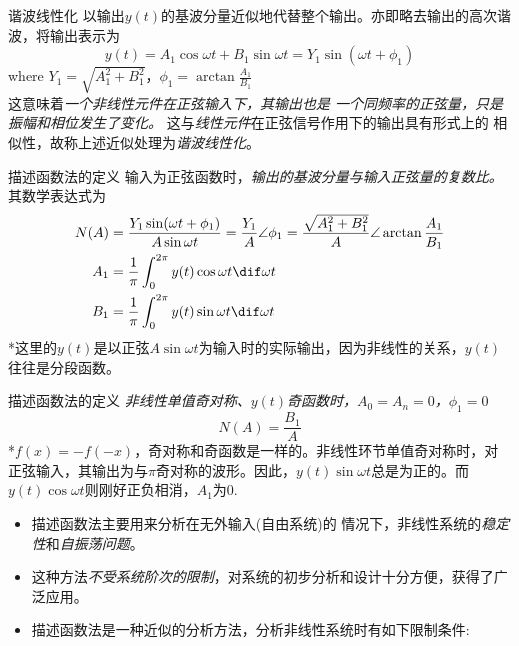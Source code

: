 \documentclass[handout,cjkutf8,table,aspectratio=1610]{beamer} %
\begin{document}
\begin{frame}{谐波线性化}
	以输出$y(t)$的基波分量近似地代替整个输出。亦即略去输出的高次谐波，将输出表示为
	$$y(t)=A_1\cos\omega t+B_1\sin\omega t=Y_1\sin(\omega t+\phi_1)$$
	where $Y_1=\sqrt{A_1^2+B_1^2}$，$\phi_1=\arctan\frac{A_1}{B_1}$\\
	这意味着\emph{一个非线性元件在正弦输入下，其输出也是 一个同频率的正弦量，只是振幅和相位发生了变化。} 这与\emph{线性元件}在正弦信号作用下的输出具有形式上的 相似性，故称上述近似处理为\emph{谐波线性化}。
\end{frame}

\begin{frame}{描述函数法的定义}
	输入为正弦函数时，\emph{输出的基波分量与输入正弦量的复数比。}其数学表达式为
	\begin{align*}
		N(A)	&= \frac{Y_1\sin(\omega t+\phi_1)}{A\sin\omega t}=\frac{Y_1}{A}\angle\phi_1=\frac{\sqrt{A_1^2+B_1^2}}{A}\angle\arctan\frac{A_1}{B_1}\\
		A_1	&= \frac{1}{\pi}\int_0^{2\pi}y(t)\cos\omega t\dif\omega t\\
		B_1	&= \frac{1}{\pi}\int_0^{2\pi}y(t)\sin\omega t\dif\omega t
	\end{align*}
	*这里的$y(t)$是以正弦$A\sin\omega t$为输入时的实际输出，因为非线性的关系，$y(t)$往往是分段函数。
\end{frame}

\begin{frame}{描述函数法的定义}
	\emph{非线性单值奇对称、$y(t)$奇函数时，$A_0=A_n=0$，$\phi_1=0$}
	$$N(A)=\frac{B_1}{A}$$
	*$f(x)=-f(-x)$，奇对称和奇函数是一样的。非线性环节单值奇对称时，对正弦输入，其输出为与$\pi$奇对称的波形。因此，$y(t)\sin\omega t$总是为正的。而$y(t)\cos\omega t$则刚好正负相消，$A_1$为0.
	\begin{itemize}
		\item 描述函数法主要用来分析在无外输入(自由系统)的 情况下，非线性系统的\emph{稳定性}和\emph{自振荡问题}。
		\item 这种方法\emph{不受系统阶次的限制}，对系统的初步分析和设计十分方便，获得了广泛应用。
		\item 描述函数法是一种近似的分析方法，分析非线性系统时有如下限制条件:
	\end{itemize}
\end{frame}
\end{document}

